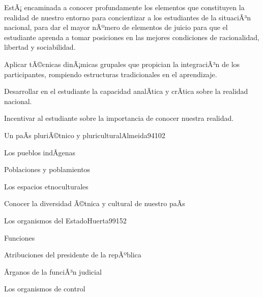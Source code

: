 \begin{syllabus}


\begin{justification}
EstÃ¡ encaminada a conocer profundamente los elementos que constituyen la realidad de 
nuestro entorno para concientizar a los estudiantes de la situaciÃ³n nacional, 
para dar el mayor nÃºmero de elementos de juicio para que el estudiante aprenda a tomar 
posiciones en las mejores condiciones de racionalidad, libertad y sociabilidad.
\end{justification}

\begin{goals}
\item Aplicar tÃ©cnicas dinÃ¡micas grupales que propician la integraciÃ³n de los participantes, rompiendo estructuras tradicionales en el aprendizaje.
\item Desarrollar en el estudiante la capacidad analÃ­tica y crÃ­tica sobre la realidad nacional.
\item Incentivar al estudiante sobre la importancia de conocer nuestra realidad.
\end{goals}

\begin{outcomes}
\end{outcomes}

\begin{unit}{Un paÃ­s pluriÃ©tnico y pluricultural}{Almeida94}{10}{2}
   \begin{topics}
	\item Los pueblos indÃ­genas
	\item Poblaciones y poblamientos
	\item Los espacios etnoculturales
   \end{topics}

   \begin{unitgoals}
      \item Conocer la diversidad Ã©tnica y cultural de nuestro paÃ­s
   \end{unitgoals}
\end{unit}

\begin{unit}{Los organismos del Estado}{Huerta99}{15}{2}
   \begin{topics}
      \item Funciones
	\item Atribuciones del presidente de la repÃºblica
	\item Ãrganos de la funciÃ³n judicial
	\item Los organismos de control
  \end{topics}


\end{unit}
\end{syllabus}
